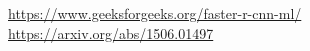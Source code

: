 \url{https://www.geeksforgeeks.org/faster-r-cnn-ml/}\\
\url{https://arxiv.org/abs/1506.01497}

























































































































































